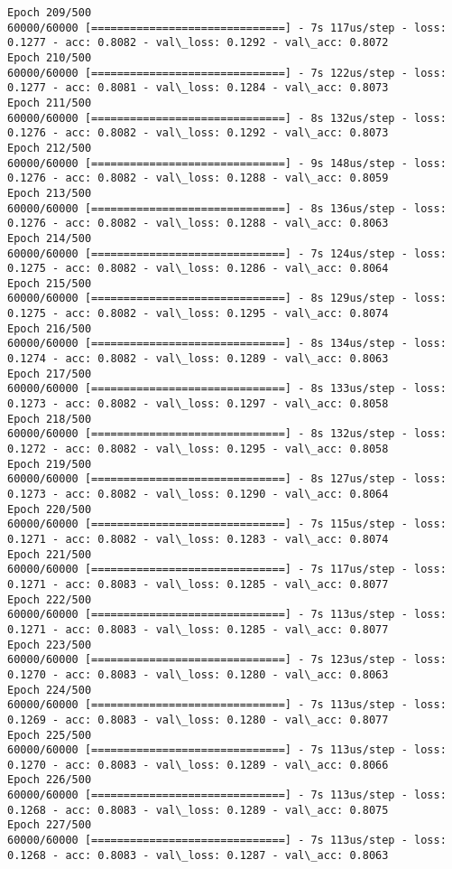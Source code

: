 \documentclass[11pt]{article}
\begin{document}
\begin{Verbatim}[commandchars=\\\{\}]
Epoch 209/500
60000/60000 [==============================] - 7s 117us/step - loss: 0.1277 - acc: 0.8082 - val\_loss: 0.1292 - val\_acc: 0.8072
Epoch 210/500
60000/60000 [==============================] - 7s 122us/step - loss: 0.1277 - acc: 0.8081 - val\_loss: 0.1284 - val\_acc: 0.8073
Epoch 211/500
60000/60000 [==============================] - 8s 132us/step - loss: 0.1276 - acc: 0.8082 - val\_loss: 0.1292 - val\_acc: 0.8073
Epoch 212/500
60000/60000 [==============================] - 9s 148us/step - loss: 0.1276 - acc: 0.8082 - val\_loss: 0.1288 - val\_acc: 0.8059
Epoch 213/500
60000/60000 [==============================] - 8s 136us/step - loss: 0.1276 - acc: 0.8082 - val\_loss: 0.1288 - val\_acc: 0.8063
Epoch 214/500
60000/60000 [==============================] - 7s 124us/step - loss: 0.1275 - acc: 0.8082 - val\_loss: 0.1286 - val\_acc: 0.8064
Epoch 215/500
60000/60000 [==============================] - 8s 129us/step - loss: 0.1275 - acc: 0.8082 - val\_loss: 0.1295 - val\_acc: 0.8074
Epoch 216/500
60000/60000 [==============================] - 8s 134us/step - loss: 0.1274 - acc: 0.8082 - val\_loss: 0.1289 - val\_acc: 0.8063
Epoch 217/500
60000/60000 [==============================] - 8s 133us/step - loss: 0.1273 - acc: 0.8082 - val\_loss: 0.1297 - val\_acc: 0.8058
Epoch 218/500
60000/60000 [==============================] - 8s 132us/step - loss: 0.1272 - acc: 0.8082 - val\_loss: 0.1295 - val\_acc: 0.8058
Epoch 219/500
60000/60000 [==============================] - 8s 127us/step - loss: 0.1273 - acc: 0.8082 - val\_loss: 0.1290 - val\_acc: 0.8064
Epoch 220/500
60000/60000 [==============================] - 7s 115us/step - loss: 0.1271 - acc: 0.8082 - val\_loss: 0.1283 - val\_acc: 0.8074
Epoch 221/500
60000/60000 [==============================] - 7s 117us/step - loss: 0.1271 - acc: 0.8083 - val\_loss: 0.1285 - val\_acc: 0.8077
Epoch 222/500
60000/60000 [==============================] - 7s 113us/step - loss: 0.1271 - acc: 0.8083 - val\_loss: 0.1285 - val\_acc: 0.8077
Epoch 223/500
60000/60000 [==============================] - 7s 123us/step - loss: 0.1270 - acc: 0.8083 - val\_loss: 0.1280 - val\_acc: 0.8063
Epoch 224/500
60000/60000 [==============================] - 7s 113us/step - loss: 0.1269 - acc: 0.8083 - val\_loss: 0.1280 - val\_acc: 0.8077
Epoch 225/500
60000/60000 [==============================] - 7s 113us/step - loss: 0.1270 - acc: 0.8083 - val\_loss: 0.1289 - val\_acc: 0.8066
Epoch 226/500
60000/60000 [==============================] - 7s 113us/step - loss: 0.1268 - acc: 0.8083 - val\_loss: 0.1289 - val\_acc: 0.8075
Epoch 227/500
60000/60000 [==============================] - 7s 113us/step - loss: 0.1268 - acc: 0.8083 - val\_loss: 0.1287 - val\_acc: 0.8063

\end{Verbatim}
\end{document}
